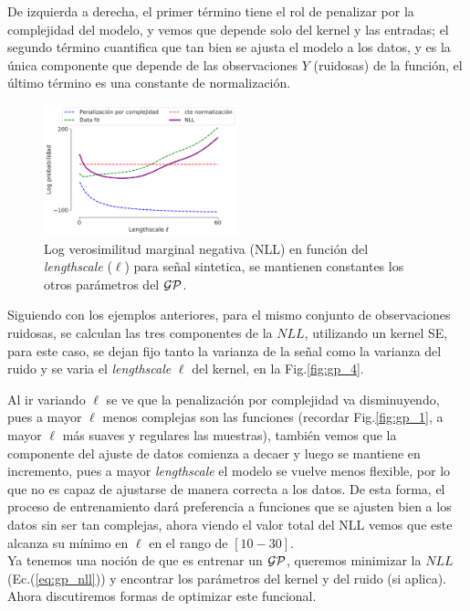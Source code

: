 De izquierda a derecha, el primer término tiene el rol de penalizar por la complejidad del modelo, y vemos que depende solo del kernel y las entradas; el segundo término cuantifica que tan bien se ajusta el modelo a los datos, y es la única componente que depende de las observaciones $Y$ (ruidosas) de la función, el último término es una constante de normalización.\\


\begin{figure}[H]
	\centering
	\includegraphics[width=0.5\textwidth]{img/cap8_nll_partes}
	\caption{Log verosimilitud marginal negativa (NLL) en función del \textit{lengthscale} ($\ell$) para señal sintetica, se mantienen constantes los otros parámetros del $\mathcal{GP}$.}\label{fig:gp_4}
	\label{fig:nll_por partes}
\end{figure}

Siguiendo con los ejemplos anteriores, para el mismo conjunto de observaciones ruidosas, se calculan las tres componentes de la $NLL$, utilizando un kernel SE, para este caso, se dejan fijo tanto la varianza de la señal como la varianza del ruido y se varia el \textit{lengthscale} $\ell$ del kernel, en la Fig.\ref{fig:gp_4}.

Al ir variando $\ell$ se ve que la penalización por complejidad va disminuyendo, pues a mayor $\ell$ menos complejas son las funciones (recordar Fig.\ref{fig:gp_1}, a mayor $\ell$ más suaves y regulares las muestras), también vemos que la componente del ajuste de datos comienza a decaer y luego se mantiene en incremento, pues a mayor \textit{lengthscale} el modelo se vuelve menos flexible, por lo que no es capaz de ajustarse de manera correcta a los datos. De esta forma, el proceso de entrenamiento dará preferencia a funciones que se ajusten bien a los datos sin ser tan complejas, ahora viendo el valor total del NLL vemos que este alcanza su mínimo en $\ell$ en el rango de $[10-30]$.\\


Ya tenemos una noción de que es entrenar un $\mathcal{GP}$, queremos minimizar la $NLL$ (Ec.(\ref{eq:gp_nll})) y encontrar los parámetros del kernel y del ruido (si aplica). Ahora discutiremos formas de optimizar este funcional.

